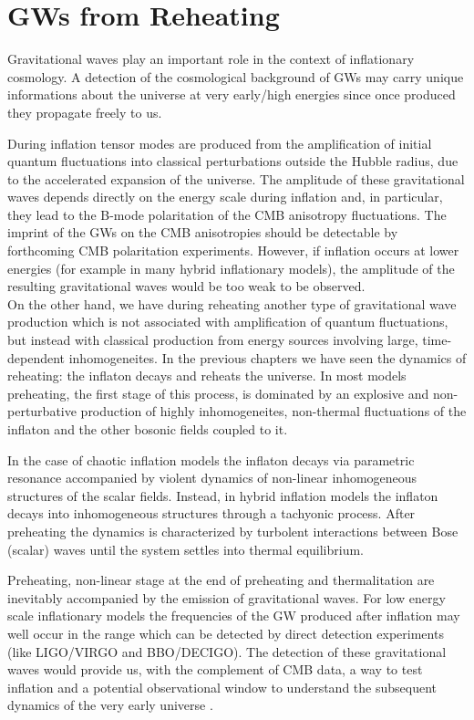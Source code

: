 \documentclass[11pt,a4paper,twoside]{book}
\begin{document}
\chapter{GWs from Reheating}
Gravitational waves play an important role in the context of inflationary cosmology. A detection of the cosmological background of GWs may carry unique informations about the universe  at very early/high energies since once produced they propagate freely to us.

 During inflation tensor modes are produced from the amplification of initial quantum fluctuations into classical perturbations outside the Hubble radius, due to the accelerated expansion of the universe. The amplitude of these gravitational waves depends directly on the energy scale during inflation and, in particular, they lead to the B-mode polaritation of the CMB anisotropy fluctuations. The imprint of the GWs on the CMB anisotropies should be detectable by forthcoming CMB polaritation experiments. However, if inflation occurs at lower energies (for example in many hybrid inflationary models), the amplitude of the resulting gravitational waves would be too weak to be observed. 
\\
 On the other hand, we have during reheating another type of gravitational wave production which is not associated with amplification of quantum fluctuations, but instead with classical production from energy sources involving large, time-dependent inhomogeneites. In the previous chapters we have seen the dynamics of reheating: the inflaton decays and reheats the universe. In most models preheating, the first stage of this process, is dominated by an explosive and non-perturbative production of highly inhomogeneites, non-thermal fluctuations of the inflaton and the other bosonic fields coupled to it.
 
 In the case of chaotic inflation models the inflaton decays via parametric resonance accompanied by violent dynamics of non-linear inhomogeneous structures of the scalar fields. Instead, in hybrid inflation models the inflaton decays into inhomogeneous structures through a tachyonic process. After preheating the dynamics is characterized by turbolent interactions between Bose (scalar) waves until the system settles into thermal equilibrium.
 
 Preheating, non-linear stage at the end of preheating and thermalitation are inevitably accompanied by the emission of gravitational waves. For low energy scale inflationary models the frequencies of the GW produced after inflation may well occur in the range which can be detected by direct detection experiments (like LIGO/VIRGO and BBO/DECIGO). The detection of these gravitational waves would provide us, with the complement of CMB data, a way to test inflation and a potential observational window to understand the subsequent dynamics of the very early universe \cite{Chap7:GreenMethod}.
 
\end{document}
